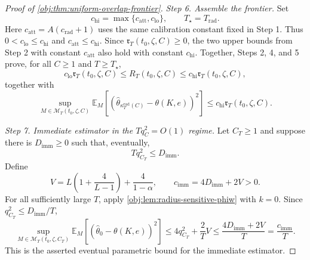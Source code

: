 \documentclass[11pt]{article}
\begin{document}
\begin{proof}[Proof of \cref{obj:thm:uniform-overlap-frontier}]
\emph{Step 6. Assemble the frontier.}
Set
\[
c_{\mathrm{hi}}=\max\{c_{\mathrm{att}},c_{\mathrm{lo}}\},
\qquad
T_\star=T_{\mathrm{rad}}.
\]
Here \(c_{\mathrm{att}}=A(c_{\mathrm{rad}}+1)\) uses the same calibration constant
fixed in Step 1.  Thus \(0<c_{\mathrm{lo}}\le c_{\mathrm{hi}}\) and
\(c_{\mathrm{att}}\le c_{\mathrm{hi}}\).  Since
\(\mathfrak r_T(t_0,\zeta,C)\ge0\), the two upper bounds from Step 2 with constant
\(c_{\mathrm{att}}\) also hold with constant \(c_{\mathrm{hi}}\).  Together,
Steps 2, 4, and 5 prove, for all \(C\ge1\) and \(T\ge T_\star\),
\[
c_{\mathrm{lo}}\mathfrak r_T(t_0,\zeta,C)
\le
R_T(t_0,\zeta,C)
\le
c_{\mathrm{hi}}\mathfrak r_T(t_0,\zeta,C),
\]
together with
\[
\sup_{M\in\mathcal M_T(t_0,\zeta,C)}
\mathbb E_M[
(\widehat\theta_{\kappa_T^{\mathrm{rad}}(C)}-\theta(K,e))^2]
\le
c_{\mathrm{hi}}\mathfrak r_T(t_0,\zeta,C).
\] %

\emph{Step 7. Immediate estimator in the \(Tq_C^2=O(1)\) regime.}
Let \(C_T\ge1\) and suppose there is \(D_{\mathrm{imm}}\ge0\) such that,
eventually,
\[
Tq_{C_T}^2\le D_{\mathrm{imm}} .
\]
Define
\[
V=L\left(1+\frac4{L-1}\right)+\frac4{1-\alpha},
\qquad
c_{\mathrm{imm}}=4D_{\mathrm{imm}}+2V>0.
\]
For all sufficiently large \(T\), apply
\cref{obj:lem:radius-sensitive-phiw} with \(k=0\).  Since
\(q_{C_T}^2\le D_{\mathrm{imm}}/T\),
\[
\sup_{M\in\mathcal M_T(t_0,\zeta,C_T)}
\mathbb E_M[(\widehat\theta_0-\theta(K,e))^2]
\le
4q_{C_T}^2+\frac2T V
\le
\frac{4D_{\mathrm{imm}}+2V}{T}
=
\frac{c_{\mathrm{imm}}}{T}.
\]
This is the asserted eventual parametric bound for the immediate estimator. %
\end{proof}
\end{document}
